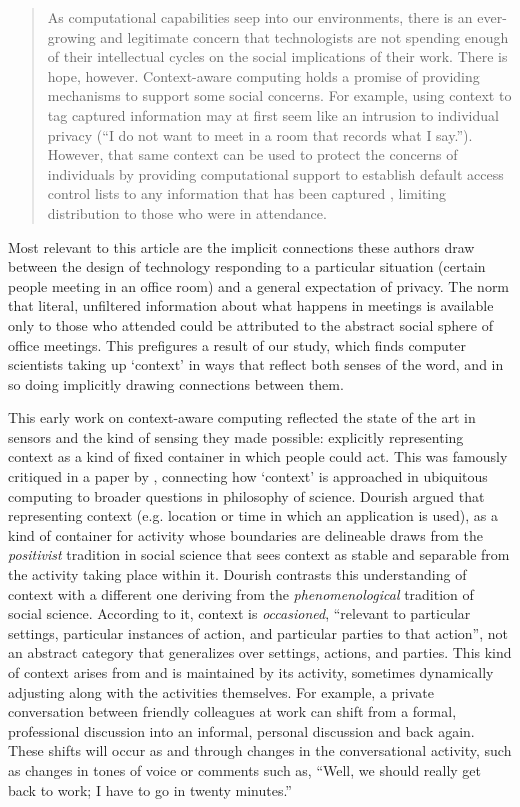 \documentclass[../thesis.tex]{subfiles}
\begin{document}
\begin{quote}
As computational
capabilities seep into our environments, there is an ever-growing and
legitimate concern that technologists are not spending enough of their
intellectual cycles on the social implications of their work. There is
hope, however. Context-aware computing holds a promise of providing
mechanisms to support some social concerns. For example, using context
to tag captured information may at first seem like an intrusion to
individual privacy (``I do not want to meet in a room
that records what I say.''). However, that same
context can be used to protect the concerns of individuals by providing
computational support to establish default access control
lists to any
information that has been captured \cite{lau1999privacy},
limiting distribution to those who were in
attendance.
\end{quote}

Most relevant to this
article are the implicit connections these authors draw between the
design of technology responding to a particular situation
(certain people meeting in an office room)
and a general expectation of
privacy. The norm that literal, unfiltered information about what
happens in meetings is available only to those who attended could be
attributed to the abstract social sphere
of office meetings. This prefigures a result of our study, which finds
computer scientists taking up `context'
in ways that reflect both senses of the word, and in so doing
implicitly drawing connections between them.

This early work on context-aware computing reflected the state of the
art in sensors and the kind of sensing they made possible: explicitly
representing context as a kind of fixed container in which people could
act. This was famously critiqued in a paper by \citet{dourish2004we},
connecting how `context' is approached
in ubiquitous computing to broader questions in philosophy of science.
Dourish argued that representing context (e.g. location or time in
which an application is used), as a kind of container for activity
whose boundaries are delineable draws from the \textit{positivist}
tradition in social science that sees context as stable and separable
from the activity taking place within it. Dourish contrasts this
understanding of context with a different one deriving from the
\textit{phenomenological} tradition of social science.
According to it,
context is \textit{occasioned}, ``relevant to
particular settings, particular instances of action, and particular
parties to that action'', not an abstract category
that generalizes over settings, actions, and parties. This kind of
context arises from and is maintained by its activity, sometimes
dynamically adjusting along with the activities themselves. For
example, a private conversation between friendly
colleagues at work can
shift from a formal, professional discussion into an
informal, personal
discussion and back again. These shifts will occur as and through
changes in the conversational activity, such as changes in tones of
voice or comments such as, ``Well, we should really
get back to work; I have to go in twenty minutes.''
\end{document}
